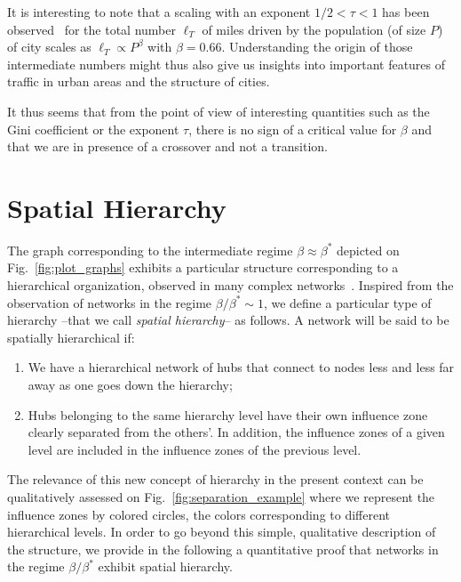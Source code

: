 It is interesting to note that a scaling with an exponent $1/2<\tau < 1$ has
been observed~\cite{Samaniego:2008,Barthelemy:2011} for the total number
$\ell_T$ of miles driven by the population (of size $P$) of city scales as
$\ell_T \propto P^{\beta}$ with $\beta=0.66$. Understanding the origin of those
intermediate numbers might thus also give us insights into important features of
traffic in urban areas and the structure of cities.

It thus seems that from the point of view of interesting quantities such as the
Gini coefficient or the exponent $\tau$, there is no sign of a critical value
for $\beta$ and that we are in presence of a crossover and not a transition.


\section{Spatial Hierarchy}

The graph corresponding to the intermediate regime $\beta \approx \beta^*$
depicted on Fig.~\ref{fig:plot_graphs} exhibits a particular structure
corresponding to a hierarchical organization, observed in many complex
networks~\cite{Sales-Pardo:2007}. Inspired from the observation of networks in
the regime $\beta/\beta^* \sim 1$, we define a particular type of hierarchy
--that we call \emph{spatial hierarchy}-- as follows. A network will be said to
be spatially hierarchical if:

\begin{enumerate}
    \item  We have a hierarchical network of hubs that connect to nodes less and less far away as one goes down the hierarchy;
    \item Hubs belonging to the same hierarchy level have their own influence zone clearly separated from the others'. In addition, the influence zones of a given level are included in the influence zones of the previous level.
\end{enumerate} 

The relevance of this new concept of hierarchy in the present context can be
qualitatively assessed on Fig.~\ref{fig:separation_example} where we represent
the influence zones by colored circles, the colors corresponding to different
hierarchical levels. In order to go beyond this simple, qualitative description
of the structure, we provide in the following a quantitative proof that networks
in the regime $\beta / \beta^*$ exhibit spatial hierarchy.

